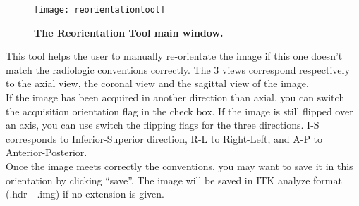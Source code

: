 \begin{figure}[htbp]
  \centering \texttt{[image: reorientationtool]}
  \caption{{\bf The Reorientation Tool main window. }
  \label{fig:reorientationtool}}
\end{figure}

This tool helps the user to manually re-orientate the image if this one doesn't match the
radiologic conventions correctly. The 3 views correspond respectively to the axial view,
the coronal view and the sagittal view of the image. 
\ \\

If the image has been acquired in another direction than axial, you can switch the
acquisition orientation flag in the check box. If the image is still flipped over an axis,
you can use switch the flipping flags for the three directions. I-S corresponds to
Inferior-Superior direction, R-L to Right-Left, and A-P to Anterior-Posterior. 
\ \\

Once the image meets correctly the conventions, you may want to save it in this
orientation by clicking ``save''. The image will be saved in ITK analyze format (.hdr -
.img) if no extension is given.
\ \\
